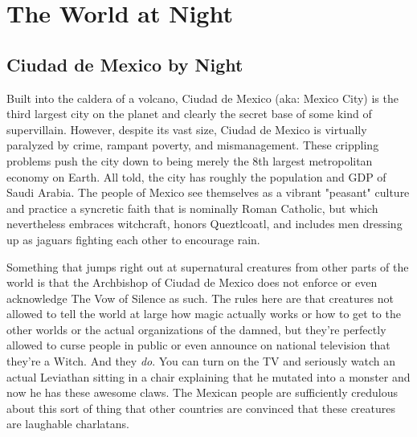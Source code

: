 \chapter{The World at Night}

\section{Ciudad de Mexico by Night}

Built into the caldera of a volcano, Ciudad de Mexico (aka: Mexico City) is the third largest city on the planet and clearly the secret base of some kind of supervillain. However, despite its vast size, Ciudad de Mexico is virtually paralyzed by crime, rampant poverty, and mismanagement. These crippling problems push the city down to being merely the 8th largest metropolitan economy on Earth. All told, the city has roughly the population and GDP of Saudi Arabia. The people of Mexico see themselves as a vibrant "peasant" culture and practice a syncretic faith that is nominally Roman Catholic, but which nevertheless embraces witchcraft, honors Queztlcoatl, and includes men dressing up as jaguars fighting each other to encourage rain.

Something that jumps right out at supernatural creatures from other parts of the world is that the Archbishop of Ciudad de Mexico does not enforce or even acknowledge The Vow of Silence as such. The rules here are that creatures not allowed to tell the world at large how magic actually works or how to get to the other worlds or the actual organizations of the damned, but they're perfectly allowed to curse people in public or even announce on national television that they're a Witch. And they \textit{do}. You can turn on the TV and seriously watch an actual Leviathan sitting in a chair explaining that he mutated into a monster and now he has these awesome claws. The Mexican people are sufficiently credulous about this sort of thing that other countries are convinced that these creatures are laughable charlatans. 


